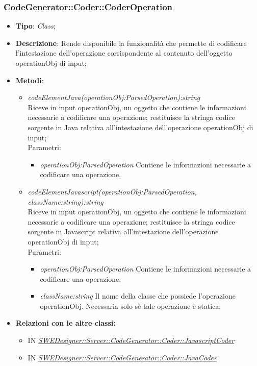 \documentclass[../DefinizioneDiProdotto.tex]{subfiles}
\begin{document}
			\subsubsection{CodeGenerator::Coder::CoderOperation}
			\hypertarget{SWEDesigner::Server::CodeGenerator::Coder::CoderOperation}{}
			\begin{itemize}
				\item \textbf{Tipo}: \emph{Class};
				\item \textbf{Descrizione}: Rende disponibile la funzionalità che permette di codificare l'intestazione dell'operazione corrispondente al contenuto dell'oggetto operationObj di input; \\
				\item \textbf{Metodi}:
				\begin{itemize}
					\item \emph{codeElementJava(operationObj:ParsedOperation):string} \\ 
					Riceve in input operationObj, un oggetto che contiene le informazioni necessarie a codificare una operazione; 
					restituisce la stringa codice sorgente in Java relativa all'intestazione dell'operazione operationObj di input; \\
					Parametri:
					\begin{itemize}
						\item \emph{operationObj:ParsedOperation} Contiene le informazioni necessarie a codificare una operazione.
					\end{itemize}
					
					
					
					\item \emph{codeElementJavascript(operationObj:ParsedOperation, className:string):string} \\ 
					Riceve in input operationObj, un oggetto che contiene le informazioni necessarie a codificare una operazione; 
					restituisce la stringa codice sorgente in Javascript relativa all'intestazione dell'operazione operationObj di input; \\
					Parametri:
					\begin{itemize}
						\item \emph{operationObj:ParsedOperation} Contiene le informazioni necessarie a codificare una operazione;
						\item \emph{className:string} Il nome della classe che possiede l'operazione operationObj. Necessaria solo sè tale operazione è statica;
					\end{itemize}
				\end{itemize}
				
				\item \textbf{Relazioni con le altre classi:}
				\begin{itemize}
					\item IN \hyperlink{SWEDesigner::Server::CodeGenerator::Coder::JavascriptCoder}{\emph{SWEDesigner::Server::CodeGenerator::Coder::JavascriptCoder}}
					\item IN \hyperlink{SWEDesigner::Server::CodeGenerator::Coder::JavaCoder}{\emph{SWEDesigner::Server::CodeGenerator::Coder::JavaCoder}}
				\end{itemize}	
			\end{itemize}
			
\end{document}
